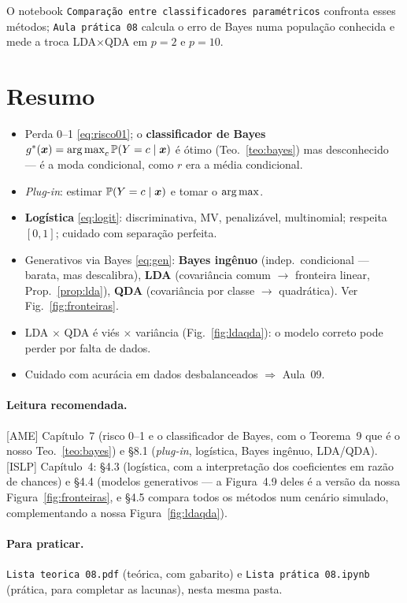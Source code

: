 \documentclass[11pt,a4paper]{article}
\begin{document}
O notebook \texttt{Comparação entre classificadores paramétricos} confronta esses
métodos; \texttt{Aula prática 08} calcula o erro de Bayes numa população conhecida
e mede a troca LDA$\times$QDA em $p=2$ e $p=10$.

\section*{Resumo}
\begin{itemize}[leftmargin=1.4cm]
  \item Perda 0--1 \eqref{eq:risco01}; o \textbf{classificador de Bayes}
        $g^*(\x)=\argmax_c\Prob(Y=c\mid\x)$ é ótimo (Teo.~\ref{teo:bayes}) mas
        desconhecido --- é a moda condicional, como $r$ era a média condicional.
  \item \emph{Plug-in}: estimar $\mathbb{P}(Y=c\mid\bm{x})$ e tomar o $\argmax$.
  \item \textbf{Logística} \eqref{eq:logit}: discriminativa, MV, penalizável,
        multinomial; respeita $[0,1]$; cuidado com separação perfeita.
  \item Generativos via Bayes \eqref{eq:gen}: \textbf{Bayes ingênuo} (indep.\
        condicional --- barata, mas descalibra), \textbf{LDA} (covariância comum
        $\to$ fronteira linear, Prop.~\ref{prop:lda}), \textbf{QDA} (covariância por
        classe $\to$ quadrática). Ver Fig.~\ref{fig:fronteiras}.
  \item LDA $\times$ QDA é viés $\times$ variância (Fig.~\ref{fig:ldaqda}): o
        modelo correto pode perder por falta de dados.
  \item Cuidado com acurácia em dados desbalanceados $\Rightarrow$ Aula~09.
\end{itemize}

\paragraph{Leitura recomendada.} [AME] Capítulo~7 (risco 0--1 e o classificador de
Bayes, com o Teorema~9 que é o nosso Teo.~\ref{teo:bayes}) e §8.1 (\emph{plug-in},
logística, Bayes ingênuo, LDA/QDA). [ISLP] Capítulo~4: §4.3 (logística, com a
interpretação dos coeficientes em razão de chances) e §4.4 (modelos generativos ---
a Figura~4.9 deles é a versão da nossa Figura~\ref{fig:fronteiras}, e §4.5 compara
todos os métodos num cenário simulado, complementando a nossa
Figura~\ref{fig:ldaqda}).

\paragraph{Para praticar.} \texttt{Lista teorica 08.pdf} (teórica, com gabarito) e \texttt{Lista prática 08.ipynb} (prática, para completar as lacunas), nesta mesma pasta.
\end{document}
